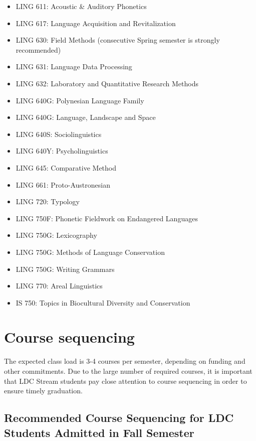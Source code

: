 \documentclass[
]{book}
\providecommand{\tightlist}{%
  \setlength{\itemsep}{0pt}\setlength{\parskip}{0pt}}
\begin{document}
\begin{itemize}
\tightlist
\item
  LING 611: Acoustic \& Auditory Phonetics
\item
  LING 617: Language Acquisition and Revitalization
\item
  LING 630: Field Methods (consecutive Spring semester is strongly recommended)
\item
  LING 631: Language Data Processing
\item
  LING 632: Laboratory and Quantitative Research Methods
\item
  LING 640G: Polynesian Language Family
\item
  LING 640G: Language, Landscape and Space
\item
  LING 640S: Sociolinguistics
\item
  LING 640Y: Psycholinguistics
\item
  LING 645: Comparative Method
\item
  LING 661: Proto-Austronesian
\item
  LING 720: Typology
\item
  LING 750F: Phonetic Fieldwork on Endangered Languages
\item
  LING 750G: Lexicography
\item
  LING 750G: Methods of Language Conservation
\item
  LING 750G: Writing Grammars
\item
  LING 770: Areal Linguistics
\item
  IS 750: Topics in Biocultural Diversity and Conservation
\end{itemize}

\hypertarget{course-sequencing}{%
\section{Course sequencing}\label{course-sequencing}}

The expected class load is 3-4 courses per semester, depending on funding and other commitments.
Due to the large number of required courses, it is important that LDC Stream students pay close attention to course sequencing in order to ensure timely graduation.

\hypertarget{recommended-course-sequencing-for-ldc-students-admitted-in-fall-semester}{%
\subsection{Recommended Course Sequencing for LDC Students Admitted in Fall Semester}\label{recommended-course-sequencing-for-ldc-students-admitted-in-fall-semester}}
\end{document}
